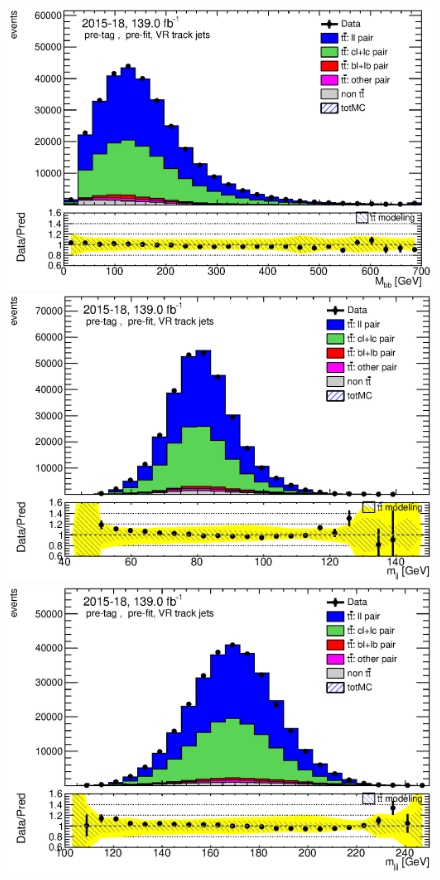 \documentclass[letterpaper,12pt]{article}
\begin{document}
	
	\begin{figure}
	\begin{minipage}[b]{.45\textwidth}
	\centering
	\includegraphics[width=1\textwidth]{Oct_distributions/pretagNoRwDL1rwithhighpTVRJets_scaledall/DataMC_Mbb.eps}
	\end{minipage}\hfill
	\begin{minipage}[b]{.45\textwidth}
	\centering
	\includegraphics[width=1\textwidth]{Oct_distributions/pretagNoRwDL1rwithhighpTVRJets_scaledall/DataMC_mjj.eps}
	\end{minipage}
	\begin{minipage}[b]{.45\textwidth}
	\centering
	\includegraphics[width=1\textwidth]{Oct_distributions/pretagNoRwDL1rwithhighpTVRJets_scaledall/DataMC_mjjj.eps}

\end{minipage}
\end{figure}
\end{document}
